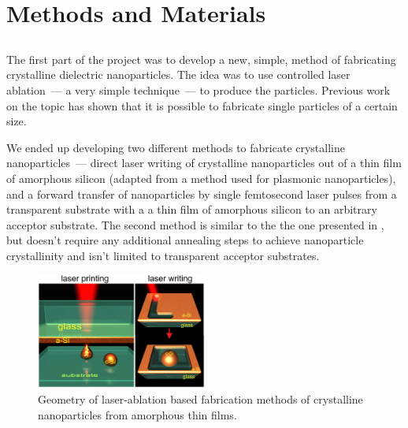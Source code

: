\section{Methods and Materials}
\label{ch:Exp}

    \subsection{}
    \label{sec:Ablation}
            The first part of the project was to develop a new, simple, method of fabricating crystalline dielectric
        nanoparticles. The idea was to use controlled laser ablation~--- a very simple technique~--- to produce the particles.
        Previous work on the topic\cite{kuznetsov2012magnetic, zywietz2014laser} has shown that it is possible to fabricate single particles
        of a certain size.

            We ended up developing two different methods to fabricate crystalline nanoparticles~--- direct laser writing of crystalline
        nanoparticles out of a thin film of amorphous silicon (adapted from a method used for plasmonic nanoparticles\cite{makarov2016controllable,
        dmitriev2016direct}), and a forward transfer of nanoparticles by single femtosecond laser pulses
        from a transparent substrate with a a thin film of amorphous silicon to an arbitrary acceptor substrate. The second method is
        similar to the the one presented in \cite{zywietz2014laser}, but doesn't require any additional annealing steps to achieve
        nanoparticle crystallinity and isn't limited to transparent acceptor substrates.

        \begin{figure}[h!]
                \begin{center}
                    \includegraphics[width=0.5\textwidth]{figs/methods/LaserPrinting.eps}
                \end{center}
                \label{fig:LaserPrinting}
                \caption{Geometry of laser-ablation based fabrication methods of crystalline nanoparticles from amorphous
                            thin films.}
        \end{figure}


